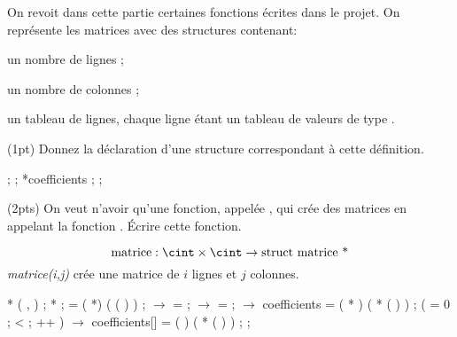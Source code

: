 

On revoit dans cette partie certaines fonctions {\'e}crites dans le
projet. On repr{\'e}sente les matrices avec des structures contenant:
\begin{flist}
\item un nombre  de lignes ;
\item un nombre  de colonnes ;
\item un tableau  de lignes, chaque ligne {\'e}tant un
  tableau de valeurs de type \cdouble.
\end{flist}

\question (1pt) Donnez la d{\'e}claration d'une structure 
correspondant {\`a} cette d{\'e}finition.
\begin{solution}
  \begin{Ccode}
    \ctab{}\cstruct {} \lb
    \ctab{}  \cint {} ;
    \ctab{}  \cint {} ;
    \ctab{}  \cdouble **coefficients ;
    \ctab{}\rb ;    
  \end{Ccode}
\end{solution}


\question (2pts) On veut n'avoir qu'une fonction, appel{\'e}e
, qui cr{\'e}e des matrices en appelant la fonction
. {\'E}crire cette fonction.
\begin{solution}
  $$
  \mbox{matrice}: \cint \times \cint \to \mbox{struct matrice *}
  $$
  \emph{matrice(i,j)} cr{\'e}e une matrice de $i$ lignes et $j$ colonnes.
  \begin{Ccode}
    \ctab{}\cstruct {} *
\ctab{} ( \cint {} , \cint {} )
\ctab{}\lb
\ctab{}  \cint {} ;
\ctab{}  \cstruct {} *  ;
\ctab{}
\ctab{}   = (\cstruct {} *)  (  ( \cstruct {} ) ) ;
\ctab{}
\ctab{}   \ensuremath{\rightarrow}  =  ;
\ctab{}   \ensuremath{\rightarrow}  =  ;
\ctab{}   \ensuremath{\rightarrow} coefficients = ( \cdouble ** )  (  *  ( \cdouble * ) ) ;
\ctab{}
\ctab{}  \cfor (  = 0 ;  <  ;  ++ )
\ctab{}    \lb
\ctab{}       \ensuremath{\rightarrow} coefficients[] = ( \cdouble * )  (  *  ( \cdouble ) ) ;
\ctab{}    \rb
\ctab{}
\ctab{}  \creturn {} ;
\ctab{}\rb
  \end{Ccode}
\end{solution}


